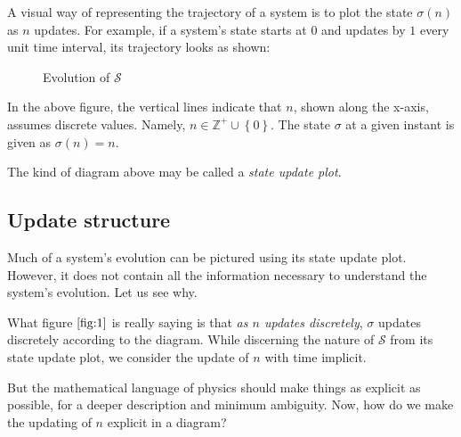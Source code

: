 \documentclass[12 pt]{article}
\begin{document}
A visual way of representing the trajectory of a system is to plot the state $\sigma \left( n \right)$ as $n$ updates. For example, if a system's state starts at $0$ and updates by $1$ every unit time interval, its trajectory looks as shown:

\begin{figure}[h]
\label{fig:1}
\centering
{}
\caption{Evolution of $\mathcal{S}$}
\end{figure}

In the above figure, the vertical lines indicate that $n$, shown along the x-axis, assumes discrete values. Namely, $n \in \mathbb{Z}^+ \cup \left\{ 0 \right\}$. The state $\sigma$ at a given instant is given as $\sigma \left( n \right) = n$.

The kind of diagram above may be called a \emph{state update plot}.

\clearpage

\subsection{Update structure}

Much of a system's evolution can be pictured using its state update plot. However, it does not contain all the information necessary to understand the system's evolution. Let us see why.

What figure $\ref{fig:1}$ is really saying is that \emph{as $n$ updates discretely}, $\sigma$ updates discretely according to the diagram. While discerning the nature of $\mathcal{S}$ from its state update plot, we consider the update of $n$ with time implicit.

But the mathematical language of physics should make things as explicit as possible, for a deeper description and minimum ambiguity. Now, how do we make the updating of $n$ explicit in a diagram?
\end{document}
